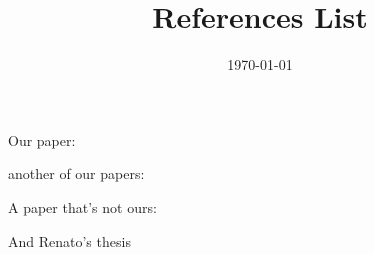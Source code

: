\documentclass[a4paper,12pt]{article}
\begin{document}
\title{References List}
\author{}
\date{\today}
\maketitle

Our paper: \cite{1211.1037}

another of our papers: \cite{1211.3141}

A paper that's not ours: \cite{1306.0516}

And Renato's thesis~\cite{quant-ph/0512258}


\nocite{*}


\end{document}
